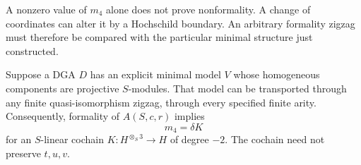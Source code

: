 A nonzero value of $m_4$ alone does not prove nonformality.
A change of coordinates can alter it by a Hochschild boundary.
An arbitrary formality zigzag must therefore be compared with the
particular minimal structure just constructed.

\begin{lemma}
\label{v4-arith:ks:projective-transport}
\ClaimStatusProvedHere{}
Suppose a DGA $D$ has an explicit minimal model $V$ whose homogeneous
components are projective $S$-modules.
That model can be transported through any finite quasi-isomorphism zigzag,
through every specified finite arity.
Consequently, formality of $A(S,c,r)$ implies
\[
 m_4=\delta K
\]
for an $S$-linear cochain $K:H^{\otimes_S3}\to H$ of degree $-2$.
The cochain need not preserve $t,u,v$.
\end{lemma}

